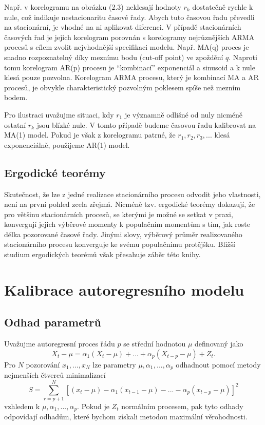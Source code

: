 Např. v korelogramu na obrázku (2.3) neklesají hodnoty $r_k$ dostatečně rychle k nule, což indikuje nestacionaritu časové řady. Abych tuto časovou řadu převedli na stacionární, je vhodné na ni aplikovat diferenci. V případě stacionárních časových řad je jejich korelogram porovnán s korelogramy nejrůznějších ARMA procesů s cílem zvolit nejvhodnější specifikaci modelu. Např. MA(q) proces je snadno rozpoznatelný díky meznímu bodu (cut-off point) ve zpoždění $q$. Naproti tomu korelogram AR(p) procesu je ``kombinací'' exponenciál a sinusoid a k nule klesá pouze pozvolna. Korelogram ARMA procesu, který je kombinací MA a AR procesů, je obvykle charakteristický pozvolným poklesem spíše než mezním bodem.

Pro ilustraci uvažujme situaci, kdy $r_1$ je významně odlišné od nuly nicméně ostatní $r_k$ jsou blízké nule. V tomto případě budeme časovou řadu kalibrovat na MA(1) model. Pokud je však z korelogramu patrné, že $r_1, r_2, r_3, ...$ klesá exponenciálně, použijeme AR(1) model.

\subsection{Ergodické teorémy}

Skutečnost, že lze z jedné realizace stacionárního procesu odvodit jeho vlastnosti, není na první pohled zcela zřejmá. Nicméně tzv. ergodické teorémy dokazují, že pro většinu stacionárních procesů, se kterými je možné se setkat v praxi, konvergují jejich výběrové momenty k populačním momentům s tím, jak roste délka pozorované časové řady. Jinými slovy, výběrový průměr realizovaného stacionárního procesu konverguje ke svému populačnímu protějšku. Bližší studium ergodických teorémů však přesahuje záběr této knihy.

\section{Kalibrace autoregresního modelu}

\subsection{Odhad parametrů}

Uvažujme autoregresní proces řádu $p$ se střední hodnotou $\mu$ definovaný jako
\begin{equation}
X_t - \mu = \alpha_1 (X_t - \mu) + ... + \alpha_p (X_{t-p} - \mu) + Z_t.
\end{equation}
Pro $N$ pozorování $x_1, ..., x_N$ lze parametry $\mu, \alpha_1, ..., \alpha_p$ odhadnout pomocí metody nejmenších čtverců minimalizací
\begin{equation}
S = \sum_{r = p + 1}^N [(x_t - \mu) - \alpha_1(x_{t - 1} - \mu) - ... - \alpha_p (x_{t - p} - \mu)]^2
\end{equation}
vzhledem k $\mu, \alpha_1, ..., \alpha_p$. Pokud je $Z_t$ normálním procesem, pak tyto odhady odpovídají odhadům, které bychom získali metodou maximální věrohodnosti.

